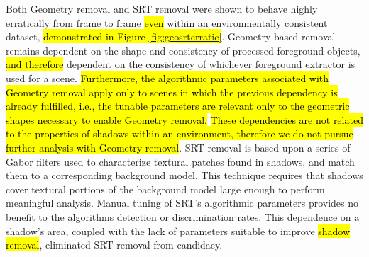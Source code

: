 \documentclass[12pt]{report}
\begin{document}

Both Geometry removal and SRT removal were shown to behave highly erratically from frame to frame \hl{even} within an environmentally consistent dataset, \hl{demonstrated in Figure \ref{fig:geosrterratic}}. Geometry-based removal remains dependent on the shape and consistency of processed foreground objects, \hl{and therefore} dependent on the consistency of whichever foreground extractor is used for a scene. \hl{Furthermore, the algorithmic parameters associated with Geometry removal apply only to scenes in which the previous dependency is already fulfilled, i.e., the tunable parameters are relevant only to the geometric shapes necessary to enable Geometry removal.} \hl{These dependencies are not related to the properties of shadows within an environment, therefore we do not pursue further analysis with Geometry removal}. SRT removal is based upon a series of Gabor filters used to characterize textural patches found in shadows, and match them to a corresponding background model. This technique requires that shadows cover textural portions of the background model large enough to perform meaningful analysis. Manual tuning of SRT's algorithmic parameters provides no benefit to the algorithms detection or discrimination rates. This dependence on a shadow's area, coupled with the lack of parameters suitable to improve \hl{shadow removal}, eliminated SRT removal from candidacy. 
\end{document}
